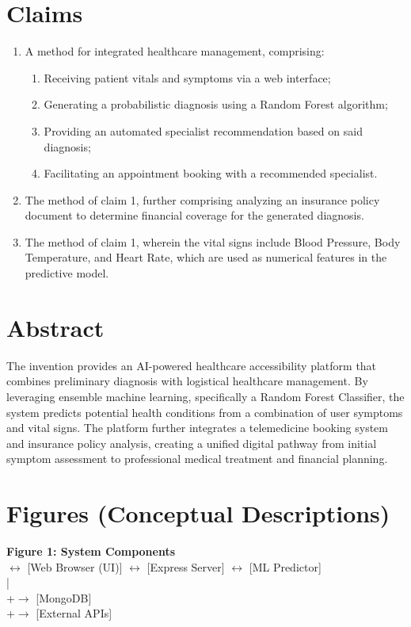 \documentclass[12pt,a4paper]{article}
\begin{document}
\section{Claims}
\begin{enumerate}[label=\textbf{\arabic*.}]
    \item A method for integrated healthcare management, comprising:
    \begin{enumerate}[label=\alph*)]
        \item Receiving patient vitals and symptoms via a web interface;
        \item Generating a probabilistic diagnosis using a Random Forest algorithm;
        \item Providing an automated specialist recommendation based on said diagnosis;
        \item Facilitating an appointment booking with a recommended specialist.
    \end{enumerate}
    \item The method of claim 1, further comprising analyzing an insurance policy document to determine financial coverage for the generated diagnosis.
    \item The method of claim 1, wherein the vital signs include Blood Pressure, Body Temperature, and Heart Rate, which are used as numerical features in the predictive model.
\end{enumerate}

\section{Abstract}
The invention provides an AI-powered healthcare accessibility platform that combines preliminary diagnosis with logistical healthcare management. By leveraging ensemble machine learning, specifically a Random Forest Classifier, the system predicts potential health conditions from a combination of user symptoms and vital signs. The platform further integrates a telemedicine booking system and insurance policy analysis, creating a unified digital pathway from initial symptom assessment to professional medical treatment and financial planning.

\section{Figures (Conceptual Descriptions)}
\textbf{Figure 1: System Components}\\
[User] $\leftrightarrow$ [Web Browser (UI)] $\leftrightarrow$ [Express Server] $\leftrightarrow$ [ML Predictor]\\
\indent\hspace{4.5cm} |\\
\indent\hspace{4.5cm} +$\rightarrow$ [MongoDB]\\
\indent\hspace{4.5cm} +$\rightarrow$ [External APIs]\\
\end{document}
